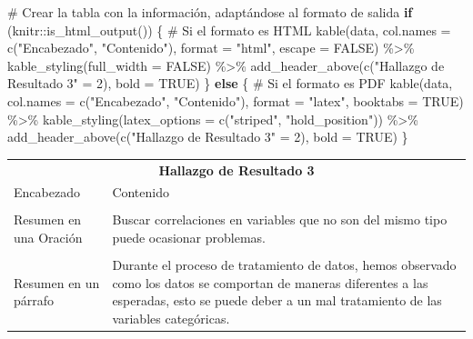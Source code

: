\documentclass[
  letterpaper,
  DIV=11,
  numbers=noendperiod]{scrreprt}
\newenvironment{Shaded}{\begin{snugshade}}{\end{snugshade}}
\newcommand{\AttributeTok}[1]{\textcolor[rgb]{0.40,0.45,0.13}{#1}}
\newcommand{\CommentTok}[1]{\textcolor[rgb]{0.37,0.37,0.37}{#1}}
\newcommand{\ConstantTok}[1]{\textcolor[rgb]{0.56,0.35,0.01}{#1}}
\newcommand{\ControlFlowTok}[1]{\textcolor[rgb]{0.00,0.23,0.31}{\textbf{#1}}}
\newcommand{\DecValTok}[1]{\textcolor[rgb]{0.68,0.00,0.00}{#1}}
\newcommand{\FunctionTok}[1]{\textcolor[rgb]{0.28,0.35,0.67}{#1}}
\newcommand{\NormalTok}[1]{\textcolor[rgb]{0.00,0.23,0.31}{#1}}
\newcommand{\OtherTok}[1]{\textcolor[rgb]{0.00,0.23,0.31}{#1}}
\newcommand{\SpecialCharTok}[1]{\textcolor[rgb]{0.37,0.37,0.37}{#1}}
\newcommand{\StringTok}[1]{\textcolor[rgb]{0.13,0.47,0.30}{#1}}
\begin{document}
\begin{Shaded}
\begin{Highlighting}[]
\CommentTok{\# Crear la tabla con la información, adaptándose al formato de salida}
\ControlFlowTok{if}\NormalTok{ (knitr}\SpecialCharTok{::}\FunctionTok{is\_html\_output}\NormalTok{()) \{}
  \CommentTok{\# Si el formato es HTML}
  \FunctionTok{kable}\NormalTok{(data, }\AttributeTok{col.names =} \FunctionTok{c}\NormalTok{(}\StringTok{"Encabezado"}\NormalTok{, }\StringTok{"Contenido"}\NormalTok{), }
        \AttributeTok{format =} \StringTok{"html"}\NormalTok{, }
        \AttributeTok{escape =} \ConstantTok{FALSE}\NormalTok{) }\SpecialCharTok{\%\textgreater{}\%}
    \FunctionTok{kable\_styling}\NormalTok{(}\AttributeTok{full\_width =} \ConstantTok{FALSE}\NormalTok{) }\SpecialCharTok{\%\textgreater{}\%}
    \FunctionTok{add\_header\_above}\NormalTok{(}\FunctionTok{c}\NormalTok{(}\StringTok{"Hallazgo de Resultado 3"} \OtherTok{=} \DecValTok{2}\NormalTok{), }\AttributeTok{bold =} \ConstantTok{TRUE}\NormalTok{)}
\NormalTok{\} }\ControlFlowTok{else}\NormalTok{ \{}
  \CommentTok{\# Si el formato es PDF}
  \FunctionTok{kable}\NormalTok{(data, }\AttributeTok{col.names =} \FunctionTok{c}\NormalTok{(}\StringTok{"Encabezado"}\NormalTok{, }\StringTok{"Contenido"}\NormalTok{), }
        \AttributeTok{format =} \StringTok{"latex"}\NormalTok{, }
        \AttributeTok{booktabs =} \ConstantTok{TRUE}\NormalTok{) }\SpecialCharTok{\%\textgreater{}\%}
    \FunctionTok{kable\_styling}\NormalTok{(}\AttributeTok{latex\_options =} \FunctionTok{c}\NormalTok{(}\StringTok{"striped"}\NormalTok{, }\StringTok{"hold\_position"}\NormalTok{)) }\SpecialCharTok{\%\textgreater{}\%}
    \FunctionTok{add\_header\_above}\NormalTok{(}\FunctionTok{c}\NormalTok{(}\StringTok{"Hallazgo de Resultado 3"} \OtherTok{=} \DecValTok{2}\NormalTok{), }\AttributeTok{bold =} \ConstantTok{TRUE}\NormalTok{)}
\NormalTok{\}}
\end{Highlighting}
\end{Shaded}

\begin{table}[!h]
\centering
\begin{tabular}{ll}
\toprule
\multicolumn{2}{c}{\textbf{Hallazgo de Resultado 3}} \\
\cmidrule(l{3pt}r{3pt}){1-2}
Encabezado & Contenido\\
\midrule
\cellcolor{gray!10}{Nombre de Su hallazgo} & \cellcolor{gray!10}{Dificultad a la hora de trabajar con variables categóricas y numéricas.}\\
Resumen en una Oración & Buscar correlaciones en variables que no son del mismo tipo puede ocasionar problemas.\\
\cellcolor{gray!10}{Problemas o Posibles Desafíos} & \cellcolor{gray!10}{A la hora de tratar variables categóricas con variables numéricas, se puede estar perdiendo información, debido a que muchas de las técnicas normalmente utilizadas son para variables numéricas.}\\
Resumen en un párrafo & Durante el proceso de tratamiento de datos, hemos observado como los datos se comportan de maneras diferentes a las esperadas, esto se puede deber a un mal tratamiento de las variables categóricas.\\
\bottomrule
\end{tabular}
\end{table}
\end{document}
